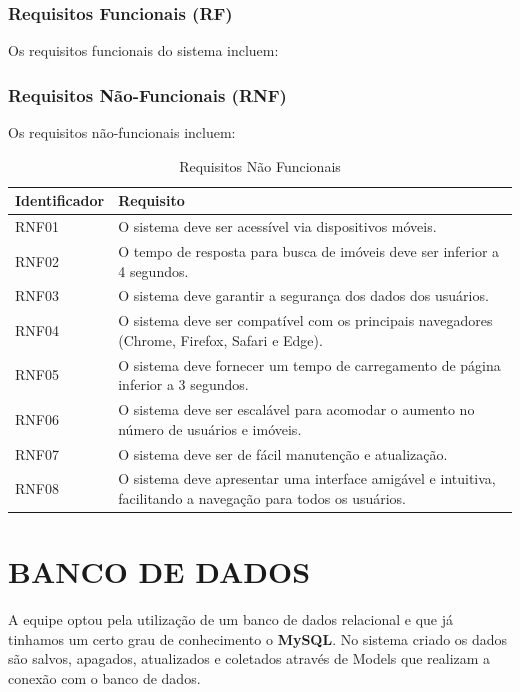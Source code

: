 \subsubsection{Requisitos Funcionais (RF)}
Os requisitos funcionais do sistema incluem:
\newpage




\subsubsection{Requisitos Não-Funcionais (RNF)}
Os requisitos não-funcionais incluem:

\begin{table}[h]
\centering
\caption{Requisitos Não Funcionais}
\begin{tabular} {|p{3cm}|p{10cm}|} 
\hline
\textbf{Identificador} & \textbf{Requisito} \\ \hline
RNF01 & O sistema deve ser acessível via dispositivos móveis. \\ \hline
RNF02 & O tempo de resposta para busca de imóveis deve ser inferior a 4 segundos. \\ \hline
RNF03 & O sistema deve garantir a segurança dos dados dos usuários. \\ \hline
RNF04 & O sistema deve ser compatível com os principais navegadores (Chrome, Firefox, Safari e Edge). \\ \hline
RNF05 & O sistema deve fornecer um tempo de carregamento de página inferior a 3 segundos. \\ \hline
RNF06 & O sistema deve ser escalável para acomodar o aumento no número de usuários e imóveis. \\ \hline
RNF07 & O sistema deve ser de fácil manutenção e atualização. \\ \hline
RNF08 & O sistema deve apresentar uma interface amigável e intuitiva, facilitando a navegação para todos os usuários. \\ \hline
\end{tabular}
\end{table}


\newpage
\section{BANCO DE DADOS}

A equipe optou pela utilização de um banco de dados relacional e que já tinhamos um certo grau de conhecimento o \textbf{MySQL}.
No sistema criado os dados são salvos, apagados, atualizados e coletados através de Models que realizam a conexão com o banco de dados.

